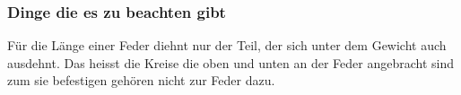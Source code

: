 \documentclass[../main.tex]{subfiles} %
\begin{document}
        \subsubsection{Dinge die es zu beachten gibt}\label{subsubsec:dinge-die-es-zu-beachten-gibt}
        Für die Länge einer Feder diehnt nur der Teil, der sich unter dem Gewicht auch ausdehnt.
        Das heisst die Kreise die oben und unten an der Feder angebracht sind zum sie befestigen gehören nicht zur Feder dazu.
\end{document}

